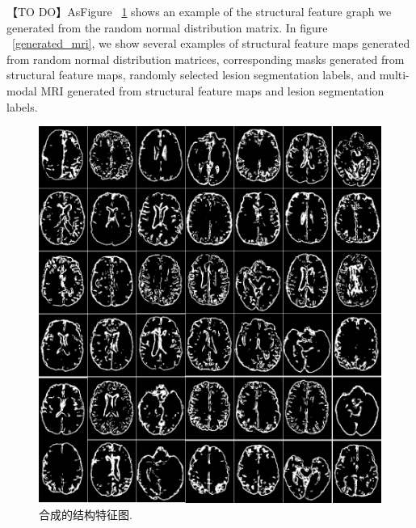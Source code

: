 \documentclass[letterpaper]{article} %
\begin{document}
【TO DO】AsFigure ~\ref{generated_f} shows an example of the structural feature graph we generated from the random normal distribution matrix. In figure ~\ref{generated_mri}, we show several examples of structural feature maps generated from random normal distribution matrices, corresponding masks generated from structural feature maps, randomly selected lesion segmentation labels, and multi-modal MRI generated from structural feature maps and lesion segmentation labels.
\begin{figure}
	\centering
	\includegraphics[width=0.98\linewidth]{figures/Fs}
	\caption{合成的结构特征图.}
	\label{generated_f}
\end{figure}
\end{document}
